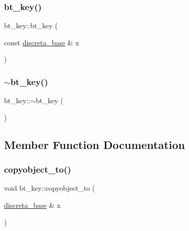 \mbox{\label{classbt__key_a64ff7f7d1285c8b5512c34f48561853f}} 
\subsubsection{\texorpdfstring{bt\+\_\+key()}{bt\_key()}\hspace{0.1cm}{\footnotesize\ttfamily [2/2]}}
{\footnotesize\ttfamily bt\+\_\+key\+::bt\+\_\+key (\begin{DoxyParamCaption}\item[{const \mbox{\hyperlink{classdiscreta__base}{discreta\+\_\+base}} \&}]{x }\end{DoxyParamCaption})}

\mbox{\label{classbt__key_a8b505bfd4e2f8b4806575070972d2b7d}} 
\subsubsection{\texorpdfstring{$\sim$bt\+\_\+key()}{~bt\_key()}}
{\footnotesize\ttfamily bt\+\_\+key\+::$\sim$bt\+\_\+key (\begin{DoxyParamCaption}{ }\end{DoxyParamCaption})}



\subsection{Member Function Documentation}
\mbox{\label{classbt__key_ae97899364f826bc3d16cce36b9c8e4f7}} 
\subsubsection{\texorpdfstring{copyobject\+\_\+to()}{copyobject\_to()}}
{\footnotesize\ttfamily void bt\+\_\+key\+::copyobject\+\_\+to (\begin{DoxyParamCaption}\item[{\mbox{\hyperlink{classdiscreta__base}{discreta\+\_\+base}} \&}]{x }\end{DoxyParamCaption})\hspace{0.3cm}{\ttfamily [virtual]}}



